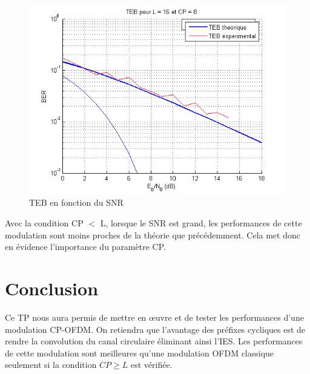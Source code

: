 \documentclass[11pt]{article}
\begin{document}
		\begin{figure}[H]
			\centering
			\includegraphics[scale=0.6]{img/teb2.jpg}
			\caption{TEB en fonction du SNR}
			\label{teb2}
		\end{figure}
		
		Avec la condition CP $<$ L, lorsque le SNR est grand, les performances de cette modulation sont moins proches de la théorie que précédemment. Cela met donc en évidence l'importance du paramètre CP.
		
		\section{Conclusion}
		Ce TP nous aura permis de mettre en œuvre et de tester les performances d'une modulation CP-OFDM. On retiendra que l'avantage des préfixes cycliques est de rendre la convolution du canal circulaire éliminant ainsi l'IES. Les performances de cette modulation sont meilleures qu'une modulation OFDM classique seulement si la condition $CP \geq L$ est vérifiée.
\end{document}
